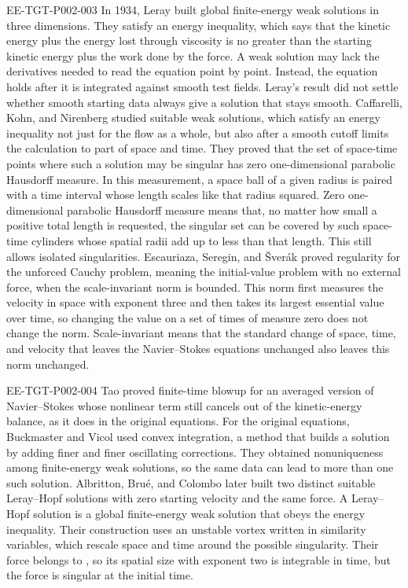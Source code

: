 \begin{EESegment}{EE-TGT-P002-003}
In 1934, Leray \cite{ref-16} built global finite-energy weak solutions in three dimensions. They
satisfy an energy inequality, which says that the kinetic energy plus the energy lost through
viscosity is no greater than the starting kinetic energy plus the work done by the force. A weak solution may lack the derivatives
needed to read the equation point by point. Instead, the equation holds after it is integrated
against smooth test fields. Leray's result did not settle whether smooth starting data always give a solution
that stays smooth. Caffarelli, Kohn, and Nirenberg \cite{ref-5} studied suitable weak solutions,
which satisfy an energy inequality not just for the flow as a whole, but also after a smooth cutoff
limits the calculation to part of space and time. They proved that the set
of space-time points where such a solution may be singular has zero one-dimensional parabolic
Hausdorff measure. In this measurement, a space ball of a given radius is paired with a time
interval whose length scales like that radius squared. Zero one-dimensional parabolic Hausdorff
measure means that, no matter how small a positive total length is requested, the singular set can
be covered by such space-time cylinders whose spatial radii add up to less than that length. This
still allows isolated singularities. Escauriaza, Seregin, and Šverák
\cite{ref-11} proved regularity for the unforced Cauchy problem, meaning the initial-value problem
with no external force, when the scale-invariant
 norm is bounded. This norm first measures the velocity in
space with exponent three and then takes its largest essential value over time, so changing the value on a set of
times of measure zero does not change the norm. Scale-invariant means that the standard change
of space, time, and velocity that leaves the Navier--Stokes equations unchanged also leaves this
norm unchanged.
\end{EESegment}

\begin{EESegment}{EE-TGT-P002-004}
Tao \cite{ref-22} proved finite-time blowup for an averaged version of Navier--Stokes whose
nonlinear term still cancels out of the kinetic-energy balance, as it does in the original
equations. For the original equations,
Buckmaster and Vicol \cite{ref-4} used convex integration, a method that builds a solution by
adding finer and finer oscillating corrections. They obtained nonuniqueness among finite-energy
weak solutions, so the same data can lead to more than one such solution. Albritton, Brué, and
Colombo \cite{ref-1} later built two distinct suitable Leray--Hopf solutions with zero starting
velocity and the same force. A Leray--Hopf solution is a global finite-energy weak solution that
obeys the energy inequality. Their construction uses an unstable vortex written in similarity
variables, which rescale space and time around the possible singularity. Their force belongs to
, so its spatial size with exponent two is integrable in time, but the force
is singular at the initial time.
\end{EESegment}

